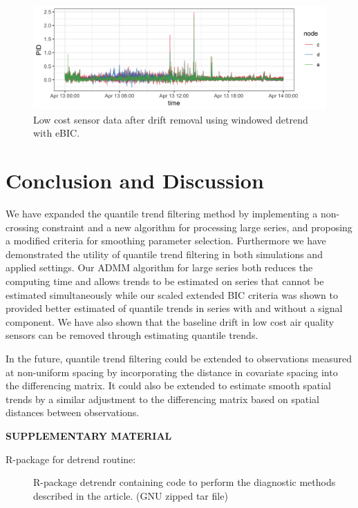 \documentclass[12pt]{article}
\begin{document}
	\begin{figure}
		\caption{Low cost sensor data after drift removal using windowed detrend with eBIC.}
		\includegraphics[width = \linewidth]{Figures/corrected_data.png}
	\end{figure}

		
	

	\section{Conclusion and Discussion}
	We have expanded the quantile trend filtering method by implementing a non-crossing constraint and a new algorithm for processing large series, and proposing a modified criteria for smoothing parameter selection. Furthermore we have demonstrated the utility of quantile trend filtering in both simulations and applied settings. Our ADMM algorithm for large series both reduces the computing time and allows trends to be estimated on series that cannot be estimated simultaneously while our scaled extended BIC criteria was shown to provided better estimated of quantile trends in series with and without a signal component. We have also shown that the baseline drift in low cost air quality sensors can be removed through estimating quantile trends.
	 
	In the future, quantile trend filtering could be extended to observations measured at non-uniform spacing by incorporating the distance in covariate spacing into the differencing matrix. It could also be extended to estimate smooth spatial trends by a similar adjustment to the differencing matrix based on spatial distances between observations. 
	
	\label{sec:conc}
	
	
	\bigskip
	\begin{center}
		{\large\bf SUPPLEMENTARY MATERIAL}
	\end{center}
	
	\begin{description}
		
		\item[R-package for detrend routine:] R-package detrendr containing code to perform the diagnostic methods described in the article. (GNU zipped tar file)
				
	\end{description}
	
	
	
	
	
\end{document}
